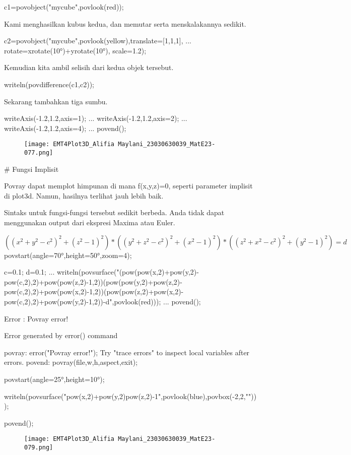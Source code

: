\documentclass{article}
\begin{document}
\>c1=povobject("mycube",povlook(red));


Kami menghasilkan kubus kedua, dan memutar serta menskalakannya
sedikit.


\>c2=povobject("mycube",povlook(yellow),translate=[1,1,1], ...  
\>     rotate=xrotate(10°)+yrotate(10°), scale=1.2);


Kemudian kita ambil selisih dari kedua objek tersebut.


\>writeln(povdifference(c1,c2));


Sekarang tambahkan tiga sumbu.


\>writeAxis(-1.2,1.2,axis=1); ...  
\>   writeAxis(-1.2,1.2,axis=2); ...  
\>   writeAxis(-1.2,1.2,axis=4); ...  
\>   povend();


\begin{figure}
    \centering
    \texttt{[image: EMT4Plot3D\_Alifia Maylani\_23030630039\_MatE23-077.png]}
    \caption{}
    \label{fig:enter-label}
\end{figure}

# Fungsi Implisit

Povray dapat memplot himpunan di mana f(x,y,z)=0, seperti parameter
implisit di plot3d. Namun, hasilnya terlihat jauh lebih baik.


Sintaks untuk fungsi-fungsi tersebut sedikit berbeda. Anda tidak dapat
menggunakan output dari ekspresi Maxima atau Euler.


$$((x^2+y^2-c^2)^2+(z^2-1)^2)*((y^2+z^2-c^2)^2+(x^2-1)^2)*((z^2+x^2-c^2)^2+(y^2-1)^2)=d$$\>povstart(angle=70°,height=50°,zoom=4);

\>c=0.1; d=0.1; ...  
\>   writeln(povsurface("(pow(pow(x,2)+pow(y,2)-pow(c,2),2)+pow(pow(z,2)-1,2))\*(pow(pow(y,2)+pow(z,2)-pow(c,2),2)+pow(pow(x,2)-1,2))\*(pow(pow(z,2)+pow(x,2)-pow(c,2),2)+pow(pow(y,2)-1,2))-d",povlook(red))); ...  
\>   povend();


    Error : Povray error!
    
    Error generated by error() command
    
    povray:
        error("Povray error!");
    Try "trace errors" to inspect local variables after errors.
    povend:
        povray(file,w,h,aspect,exit); 

\>povstart(angle=25°,height=10°); 

\>writeln(povsurface("pow(x,2)+pow(y,2)\*pow(z,2)-1",povlook(blue),povbox(-2,2,"")));

\>povend();


\begin{figure}
    \centering
    \texttt{[image: EMT4Plot3D\_Alifia Maylani\_23030630039\_MatE23-079.png]}
    \caption{}
    \label{fig:enter-label}
\end{figure}
\end{document}

